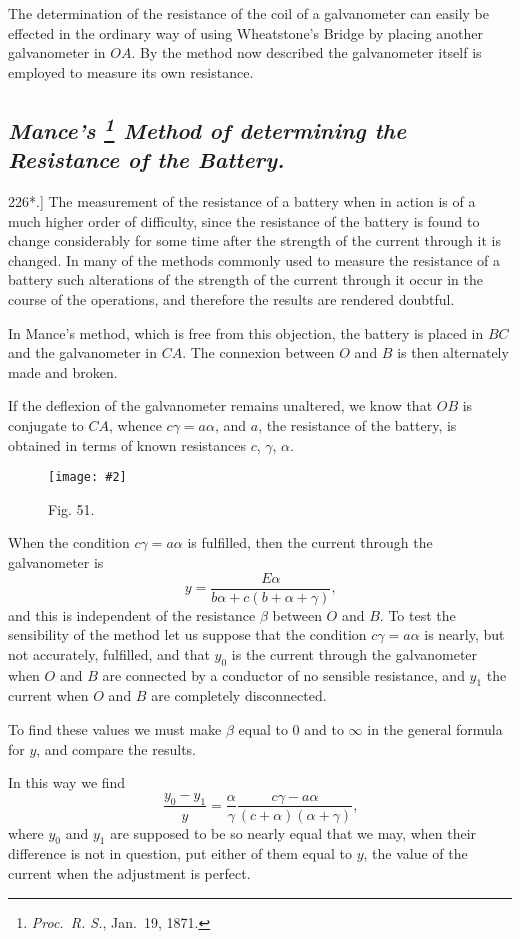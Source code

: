 \documentclass[12pt,oneside]{book}[2021/10/04]
\let\oldfootnote\footnote
\renewcommand\footnote[1]{%
\oldfootnote{\hspace{0.14em}#1}}
\newcommand{\Heading}{\centering\normalfont}
\newcommand{\Subsection}[1]{\subsection*{\normalsize\Heading\itshape #1}}
\newcommand{\Runhead}[1]{\fancyhead[C]{\iffloatpage{}{\small#1}}}
\newcommand{\article}[1]{\phantomsection \label{art:#1}{#1.]}}
\newcommand{\widefig}[3]{
\begin{figure}[ht!]
\centering
\texttt{[image: \#2]}
\caption*{\small #3}
\end{figure}}
\newcommand{\¬}{\hphantom{0}}
\begin{document}
The determination of the resistance of the coil of a galvanometer
can easily be effected in the ordinary way of using Wheatstone's
Bridge by placing another galvanometer in \(OA\). By the method
now described the galvanometer itself is employed to measure its
own resistance.

\Subsection{Mance's\footnote{
\textit{Proc.\ R. S.}, Jan.\ 19, 1871.} Method of determining the Resistance of the Battery.}

\article{226*} The measurement of the resistance of a battery when in
action is of a much higher order of difficulty, since the resistance
of the battery is found to change considerably for some time after
the strength of the current through it is changed. In many of the
methods commonly used to measure the resistance of a battery such
alterations of the strength of the current through it occur in the
course of the operations, and therefore the results are rendered
doubtful.
\Runhead{MANCE'S METHOD.}

In Mance's method, which is free from this objection, the battery
is placed in \(BC\) and the galvanometer in \(CA\). The connexion
between \(O\) and \(B\) is then alternately made and broken.

If the deflexion of the galvanometer remains unaltered, we know
that \(OB\) is conjugate to \(CA\), whence \(c\gamma = a\alpha\), and \(a\), the resistance
of the battery, is obtained in terms of known resistances \(c\), \(\gamma\), \(\alpha\).

\widefig{0.54}{212.png}{Fig. 51.}
When the condition \(c\gamma=a\alpha\) is fulfilled, then the current through
the galvanometer is
\[
y = \frac{E\alpha}{b\alpha + c(b+\alpha+\gamma)}\text{,}
\]
and this is independent of the resistance \(\beta\) between \(O\) and \(B\). To
test the sensibility of the method let us suppose that the condition
\(c\gamma=a\alpha\) is nearly, but not accurately, fulfilled, and that \(y_0\) is the
current through the galvanometer when \(O\) and \(B\) are connected
by a conductor of no sensible resistance, and \(y_1\) the current when
\(O\) and \(B\) are completely disconnected.

To find these values we must make \(\beta\) equal to 0 and to \(\infty\) in the
general formula for \(y\), and compare the results.

In this way we find
\[
\frac{y_0-y_1}{y} = \frac{\alpha}{\gamma}\frac{c\gamma-a\alpha}{(c+\alpha )(\alpha+\gamma)}\text{,}
\]
where \(y_0\) and \(y_1\) are supposed to be so nearly equal that we may,
when their difference is not in question, put either of them equal
to \(y\), the value of the current when the adjustment is perfect.
\end{document}
